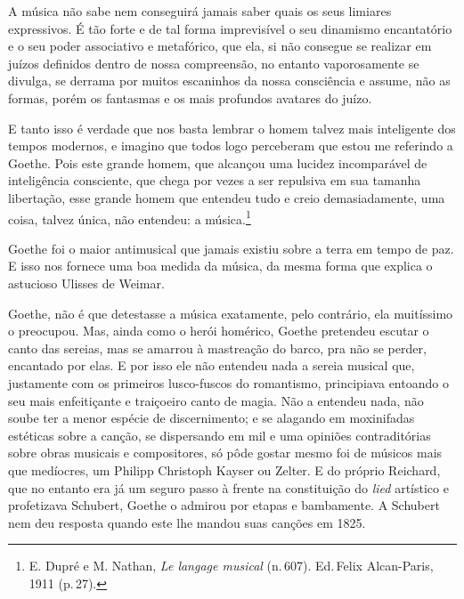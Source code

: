 A música não sabe nem conseguirá jamais saber quais os seus limiares
expressivos. É tão forte e de tal forma imprevisível o seu dinamismo
encantatório e o seu poder associativo e metafórico, que ela, si não
consegue se realizar em juízos definidos dentro de nossa compreensão, no
entanto vaporosamente se divulga, se derrama por muitos escaninhos da
nossa consciência e assume, não as formas, porém os fantasmas e os mais
profundos avatares do juízo.

E tanto isso é verdade que nos basta lembrar o homem talvez mais
inteligente dos tempos modernos, e imagino que todos logo perceberam que
estou me referindo a Goethe. Pois este grande homem, que alcançou uma
lucidez incomparável de inteligência consciente, que chega por vezes a
ser repulsiva em sua tamanha libertação, esse grande homem que entendeu
tudo e creio demasiadamente, uma coisa, talvez única, não entendeu: a
música.\footnote{E. Dupré e M. Nathan, \emph{Le langage musical} (n.\,607). Ed.\,Felix
Alcan-Paris, 1911 (p.\,27).}

Goethe foi o maior antimusical que jamais existiu sobre a terra em tempo
de paz. E isso nos fornece uma boa medida da música, da mesma forma que
explica o astucioso Ulisses de Weimar.

Goethe, não é que detestasse a música exatamente, pelo contrário, ela
muitíssimo o preocupou. Mas, ainda como o herói homérico, Goethe
pretendeu escutar o canto das sereias, mas se amarrou à mastreação do
barco, pra não se perder, encantado por elas. E por isso ele não
entendeu nada a sereia musical que, justamente com os primeiros
lusco-fuscos do romantismo, principiava entoando o seu mais enfeitiçante
e traiçoeiro canto de magia. Não a entendeu nada, não soube ter a menor
espécie de discernimento; e se alagando em moxinifadas estéticas sobre a
canção, se dispersando em mil e uma opiniões contraditórias sobre obras
musicais e compositores, só pôde gostar mesmo foi de músicos mais que
medíocres, um Philipp Christoph Kayser ou Zelter. E do próprio Reichard,
que no entanto era já um seguro passo à frente na constituição do \textit{lied}
artístico e profetizava Schubert, Goethe o admirou por etapas e
bambamente. A Schubert nem deu resposta quando este lhe mandou suas
canções em 1825.

